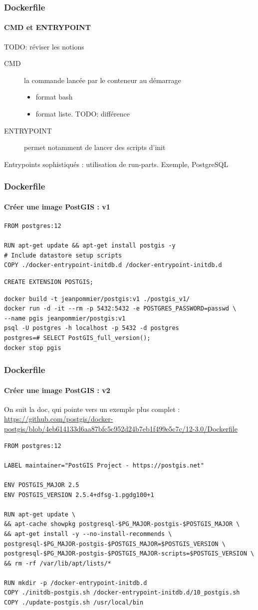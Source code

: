 \documentclass[11pt]{beamer}
\begin{document}
\begin{frame}[fragile]
\frametitle{Dockerfile}
\framesubtitle{CMD et ENTRYPOINT}
TODO: réviser les notions
\begin{description}
\item[CMD] la commande lancée par le conteneur au démarrage
\begin{itemize}
	\item format bash
	\item format liste. TODO: différence
\end{itemize}
\item[ENTRYPOINT] permet notamment de lancer des scripts d'init
\end{description}

Entrypoints sophistiqués : utilisation de run-parts. Exemple, PostgreSQL
\end{frame}

\begin{frame}[fragile]
\frametitle{Dockerfile}
\framesubtitle{Créer une image PostGIS : v1}
\begin{lstlisting}[title=Dockerfile]
FROM postgres:12

RUN apt-get update && apt-get install postgis -y
# Include datastore setup scripts
COPY ./docker-entrypoint-initdb.d /docker-entrypoint-initdb.d
\end{lstlisting}

\begin{lstlisting}[title=fichier entrypoint]
CREATE EXTENSION POSTGIS;
\end{lstlisting}
\begin{lstlisting}[title=console]
docker build -t jeanpommier/postgis:v1 ./postgis_v1/
docker run -d -it --rm -p 5432:5432 -e POSTGRES_PASSWORD=passwd \
--name pgis jeanpommier/postgis:v1
psql -U postgres -h localhost -p 5432 -d postgres
postgres=# SELECT PostGIS_full_version();
docker stop pgis
\end{lstlisting}
\end{frame}

\begin{frame}[fragile]
\frametitle{Dockerfile}
\framesubtitle{Créer une image PostGIS : v2}
On suit la doc, qui pointe vers un exemple plus complet : 
\url{https://github.com/postgis/docker-postgis/blob/4eb614133d6aa87bfc5c952d24b7eb1f499e5c7c/12-3.0/Dockerfile}
\begin{lstlisting}[basicstyle=\ttfamily\tiny]
FROM postgres:12

LABEL maintainer="PostGIS Project - https://postgis.net"

ENV POSTGIS_MAJOR 2.5
ENV POSTGIS_VERSION 2.5.4+dfsg-1.pgdg100+1

RUN apt-get update \
&& apt-cache showpkg postgresql-$PG_MAJOR-postgis-$POSTGIS_MAJOR \
&& apt-get install -y --no-install-recommends \
postgresql-$PG_MAJOR-postgis-$POSTGIS_MAJOR=$POSTGIS_VERSION \
postgresql-$PG_MAJOR-postgis-$POSTGIS_MAJOR-scripts=$POSTGIS_VERSION \
&& rm -rf /var/lib/apt/lists/*

RUN mkdir -p /docker-entrypoint-initdb.d
COPY ./initdb-postgis.sh /docker-entrypoint-initdb.d/10_postgis.sh
COPY ./update-postgis.sh /usr/local/bin
\end{lstlisting}
\end{frame}
\end{document}
